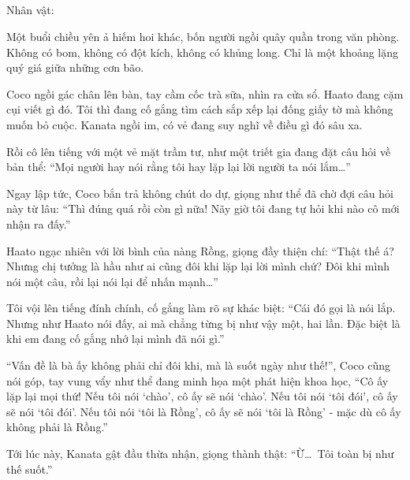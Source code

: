 \documentclass[../main.tex]{subfiles}
\begin{document}
\newpage

\subsection*{\label{ep-S7.II}}
\vspace{-4pt}
\begin{center}
  {\caviar\fontsize{12pt}{12pt}\selectfont Nhân vật:    }
\end{center}

Một buổi chiều yên ả hiếm hoi khác, bốn người ngồi quây quần trong văn phòng. Không có bom, không có đột kích, không có khủng long. Chỉ là một khoảng lặng quý giá giữa những cơn bão.

Coco ngồi gác chân lên bàn, tay cầm cốc trà sữa, nhìn ra cửa sổ. Haato đang cặm cụi viết gì đó. Tôi thì đang cố gắng tìm cách sắp xếp lại đống giấy tờ mà không muốn bỏ cuộc. Kanata ngồi im, có vẻ đang suy nghĩ về điều gì đó sâu xa.

Rồi cô lên tiếng với một vẻ mặt trầm tư, như một triết gia đang đặt câu hỏi về bản thể: ``Mọi người hay nói rằng tôi hay lặp lại lời người ta nói lắm\dots''


Ngay lập tức, Coco bắn trả không chút do dự, giọng như thể đã chờ đợi câu hỏi này từ lâu: ``Thì đúng quá rồi còn gì nữa! Nãy giờ tôi đang tự hỏi khi nào cô mới nhận ra đấy.''

Haato ngạc nhiên với lời bình của nàng Rồng, giọng đầy thiện chí: ``Thật thế á? Nhưng chị tưởng là hầu như ai cũng đôi khi lặp lại lời mình chứ? Đôi khi mình nói một câu, rồi lại nói lại để nhấn mạnh\dots''

Tôi vội lên tiếng đính chính, cố gắng làm rõ sự khác biệt: ``Cái đó gọi là nói lắp. Nhưng như Haato nói đấy, ai mà chẳng từng bị như vậy một, hai lần. Đặc biệt là khi em đang cố gắng nhớ lại mình đã nói gì.''

``Vấn đề là bà ấy không phải chỉ đôi khi, mà là suốt ngày như thế!'', Coco cũng nói góp, tay vung vẩy như thể đang minh họa một phát hiện khoa học, ``Cô ấy lặp lại mọi thứ! Nếu tôi nói `chào', cô ấy sẽ nói `chào'. Nếu tôi nói `tôi đói', cô ấy sẽ nói `tôi đói'. Nếu tôi nói `tôi là Rồng', cô ấy sẽ nói `tôi là Rồng' - mặc dù cô ấy không phải là Rồng.''

Tới lúc này, Kanata gật đầu thừa nhận, giọng thành thật: ``Ừ\dots\ Tôi toàn bị như thế suốt.''
\end{document}
